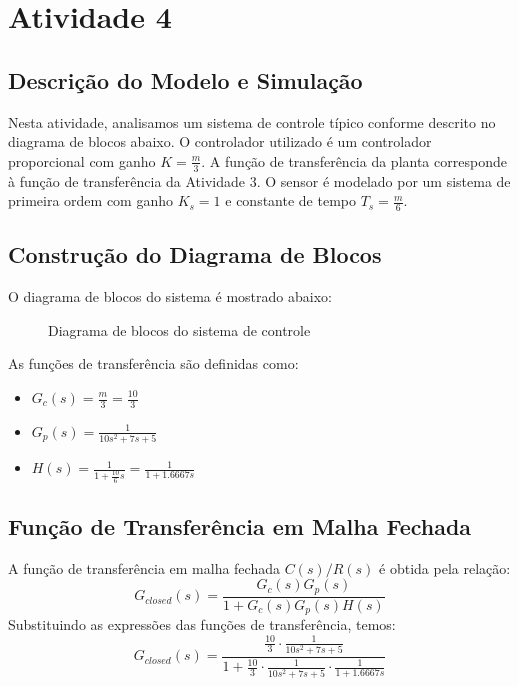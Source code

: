 \section{Atividade 4}

\subsection{Descrição do Modelo e Simulação}
Nesta atividade, analisamos um sistema de controle típico conforme descrito no diagrama de blocos abaixo. O controlador utilizado é um controlador proporcional com ganho \( K = \frac{m}{3} \). A função de transferência da planta corresponde à função de transferência da Atividade 3. O sensor é modelado por um sistema de primeira ordem com ganho \( K_s = 1 \) e constante de tempo \( T_s = \frac{m}{6} \).

\subsection{Construção do Diagrama de Blocos}
O diagrama de blocos do sistema é mostrado abaixo:
\begin{figure}[H]
    \centering
    \caption{Diagrama de blocos do sistema de controle}
    \label{fig:diagrama_blocos}
\end{figure}

As funções de transferência são definidas como:
\begin{itemize}
    \item \( G_c(s) = \frac{m}{3} = \frac{10}{3} \)
    \item \( G_p(s) = \frac{1}{10 s^2 + 7 s + 5} \)
    \item \( H(s) = \frac{1}{1 + \frac{10}{6} s} = \frac{1}{1 + 1.6667 s} \)
\end{itemize}

\subsection{Função de Transferência em Malha Fechada}
A função de transferência em malha fechada \( C(s)/R(s) \) é obtida pela relação:
\[
    G_{closed}(s) = \frac{G_c(s) G_p(s)}{1 + G_c(s) G_p(s) H(s)}
\]
Substituindo as expressões das funções de transferência, temos:
\[
    G_{closed}(s) = \frac{\frac{10}{3} \cdot \frac{1}{10 s^2 + 7 s + 5}}{1 + \frac{10}{3} \cdot \frac{1}{10 s^2 + 7 s + 5} \cdot \frac{1}{1 + 1.6667 s}}
\]

